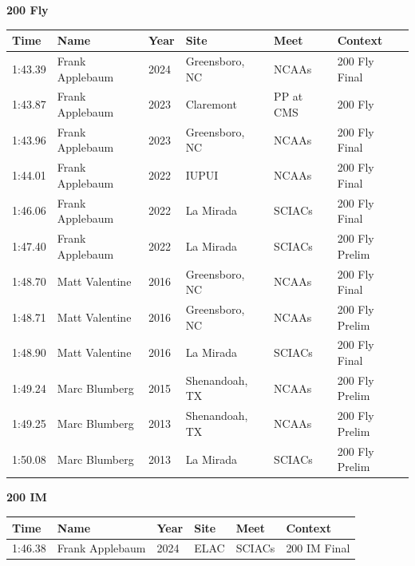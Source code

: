\noindent\begin{minipage}[t]{0.98\textwidth}
\centering
\textbf{\textcolor{teamprimary}{200 Fly}}\par
\vspace{0.5em}
\centering
\small
\renewcommand{\arraystretch}{1.0}
\setlength{\tabcolsep}{4pt}
\begin{tabular}{@{}p{2.0cm}p{3.2cm}p{1.2cm}p{2.0cm}p{2.0cm}p{2.5cm}@{}}
\toprule
\textbf{Time} & \textbf{Name} & \textbf{Year} & \textbf{Site} & \textbf{Meet} & \textbf{Context} \\
\midrule
1:43.39 & Frank Applebaum & 2024 & Greensboro, NC & NCAAs & 200 Fly Final \\
1:43.87 & Frank Applebaum & 2023 & Claremont & PP at CMS & 200 Fly \\
1:43.96 & Frank Applebaum & 2023 & Greensboro, NC & NCAAs & 200 Fly Final \\
1:44.01 & Frank Applebaum & 2022 & IUPUI & NCAAs & 200 Fly Final \\
1:46.06 & Frank Applebaum & 2022 & La Mirada & SCIACs & 200 Fly Final \\
1:47.40 & Frank Applebaum & 2022 & La Mirada & SCIACs & 200 Fly Prelim \\
1:48.70 & Matt Valentine & 2016 & Greensboro, NC & NCAAs & 200 Fly Final \\
1:48.71 & Matt Valentine & 2016 & Greensboro, NC & NCAAs & 200 Fly Prelim \\
1:48.90 & Matt Valentine & 2016 & La Mirada & SCIACs & 200 Fly Final \\
1:49.24 & Marc Blumberg & 2015 & Shenandoah, TX & NCAAs & 200 Fly Prelim \\
1:49.25 & Marc Blumberg & 2013 & Shenandoah, TX & NCAAs & 200 Fly Prelim \\
1:50.08 & Marc Blumberg & 2013 & La Mirada & SCIACs & 200 Fly Prelim \\
\bottomrule
\end{tabular}
\end{minipage}
\vspace{1.2em}
\noindent\begin{minipage}[t]{0.98\textwidth}
\centering
\textbf{\textcolor{teamprimary}{200 IM}}\par
\vspace{0.5em}
\centering
\small
\renewcommand{\arraystretch}{1.0}
\setlength{\tabcolsep}{4pt}
\begin{tabular}{@{}p{2.0cm}p{3.2cm}p{1.2cm}p{2.0cm}p{2.0cm}p{2.5cm}@{}}
\toprule
\textbf{Time} & \textbf{Name} & \textbf{Year} & \textbf{Site} & \textbf{Meet} & \textbf{Context} \\
\midrule
1:46.38 & Frank Applebaum & 2024 & ELAC & SCIACs & 200 IM Final \\
\bottomrule
\end{tabular}
\end{minipage}

